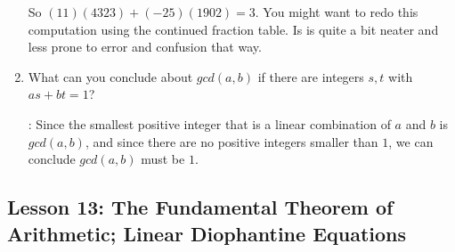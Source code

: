 \documentclass[11pt]{amsart}
\begin{document}
\begin{enumerate}
 So $(11)(4323) + (-25)(1902) = 3$. You might want to redo this computation using the continued fraction table. Is is quite a bit neater and less prone to error and confusion that way.

\medskip
 
\item What can you conclude about $gcd(a,b)$ if there are integers $s,t$ with $as+bt=1$?

\medskip
{}: Since the smallest positive integer that is a linear combination of $a$ and $b$
is $gcd(a,b)$, and since there are no positive integers smaller than $1$, we can conclude 
$gcd(a,b)$ must be $1$.

\end{enumerate}

\subsection{Lesson 13: The Fundamental Theorem of Arithmetic; Linear Diophantine Equations}
\end{document}
